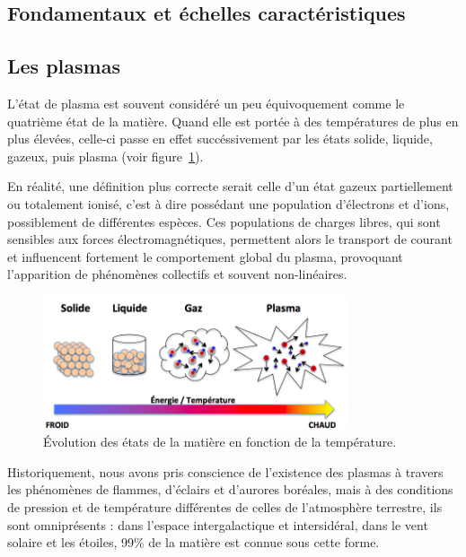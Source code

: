 \label{Introduction}
\begin{refsection}

\section{Fondamentaux et échelles caractéristiques}
\subsection{Les plasmas}
L'état de plasma est souvent considéré un peu équivoquement comme
le quatrième état de la matière. Quand elle est portée à des températures
de plus en plus élevées, celle-ci passe en effet succéssivement par les états
solide, liquide, gazeux, puis plasma (voir figure~\ref{1-plasma}).

En réalité,
une définition plus correcte serait celle d'un état gazeux partiellement ou totalement ionisé, c'est à dire possédant une population d'électrons et d'ions,
possiblement de différentes espèces. Ces populations de charges libres, qui
sont sensibles aux forces électromagnétiques, permettent alors le transport de
courant et influencent fortement le comportement global du plasma, provoquant
l'apparition de phénomènes collectifs et souvent non-linéaires.

\begin{figure}[htbp]
\centering
\includegraphics[width=0.8\textwidth]{figures/1-plasma.png}{\caption{Évolution
des états de la matière en fonction de la température.}\label{1-plasma}}
\end{figure}

Historiquement, nous avons pris conscience de l'existence des plasmas à travers
les phénomènes de flammes, d'éclairs et d'aurores boréales, mais à des
conditions de pression et de température différentes de celles de l'atmosphère
terrestre, ils sont omniprésents : dans l'espace intergalactique et
intersidéral, dans le vent solaire et les étoiles, 99\% de la matière est connue
sous cette forme.


\end{refsection}
